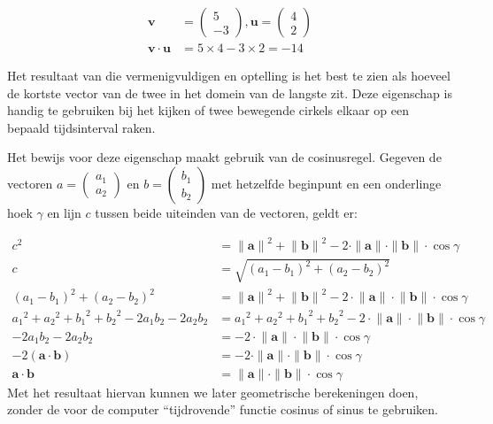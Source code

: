 \documentclass[12pt,a4paper]{article}
\begin{document}
	\begin{equation*}
		\begin{aligned}
			\mathbf{v} &= \begin{pmatrix} 5 \\ -3 \end{pmatrix}, \mathbf{u} = \begin{pmatrix} 4 \\ 2 \end{pmatrix} \\
			\mathbf{v} \cdot \mathbf{u} &= 5 \times 4 -3 \times 2 = -14
		\end{aligned}
	\end{equation*}
	
	Het resultaat van die vermenigvuldigen en optelling is het best te zien als hoeveel de kortste vector van de twee in het domein van de langste zit. Deze eigenschap is handig te gebruiken bij het kijken of twee bewegende cirkels elkaar op een bepaald tijdsinterval raken.
	
	Het bewijs voor deze eigenschap maakt gebruik van de cosinusregel. Gegeven de vectoren $a=\begin{pmatrix} a_1 \\ a_2 \end{pmatrix}$ en $b=\begin{pmatrix} b_1 \\ b_2 \end{pmatrix}$ met hetzelfde beginpunt en een onderlinge hoek $\gamma$ en lijn $c$ tussen beide uiteinden van de vectoren, geldt er:
	
	\begin{equation}
		\begin{aligned}
			c^2 &= {\|\mathbf{a}\|}^2 + {\|\mathbf{b}\|}^2 - 2 \cdot \|\mathbf{a}\| \cdot \|\mathbf{b}\| \cdot \cos\gamma \\
			c &= \sqrt{(a_1-b_1)^2 + (a_2-b_2)^2} \\
			(a_1-b_1)^2 + (a_2-b_2)^2 &= {\|\mathbf{a}\|}^2 + {\|\mathbf{b}\|}^2 - 2 \cdot {\|\mathbf{a}\|} \cdot {\|\mathbf{b}\|} \cdot \cos\gamma \\
			{a_1}^2 + {a_2}^2+ {b_1}^2 + {b_2}^2 - 2a_1b_2 - 2a_2b_2 &= {a_1}^2 + {a_2}^2+ {b_1}^2 + {b_2}^2 - 2 \cdot {\|\mathbf{a}\|} \cdot {\|\mathbf{b}\|} \cdot \cos\gamma \\
			-2a_1b_2 - 2a_2b_2 &= - 2 \cdot {\|\mathbf{a}\|} \cdot {\|\mathbf{b}\|} \cdot \cos\gamma \\
			-2(\mathbf{a} \cdot \mathbf{b}) &= - 2 \cdot \|\mathbf{a}\| \cdot \|\mathbf{b}\| \cdot \cos\gamma \\
			\mathbf{a} \cdot \mathbf{b} &= \|\mathbf{a}\| \cdot \|\mathbf{b}\| \cdot \cos\gamma
		\end{aligned}
	\end{equation}
	Met het resultaat hiervan kunnen we later geometrische berekeningen doen, zonder de voor de computer ``tijdrovende'' functie cosinus of sinus te gebruiken.
	
\end{document}
